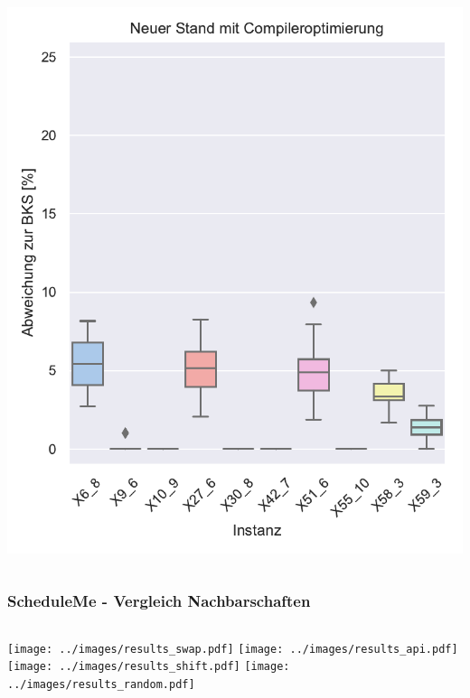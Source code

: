 \documentclass[aspectratio=169]{beamer}
\begin{document}
\begin{frame}
\begin{columns}[c]
				\includegraphics[width=\textwidth]{../images/results_new.pdf}	
		\end{columns}

\end{frame}
	

\begin{frame}
	\frametitle{ScheduleMe - Vergleich Nachbarschaften}
	
		\begin{columns}[c]
				\texttt{[image: ../images/results\_swap.pdf]}	
				\texttt{[image: ../images/results\_api.pdf]}	
				\texttt{[image: ../images/results\_shift.pdf]}	
				\texttt{[image: ../images/results\_random.pdf]}	
		\end{columns}

\end{frame}
\end{document}
